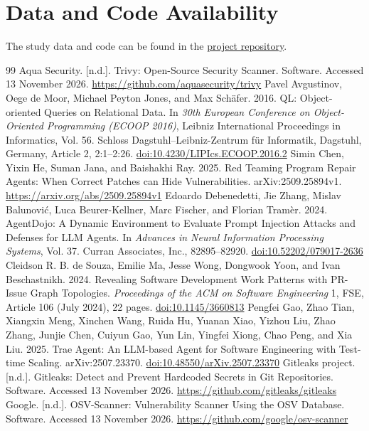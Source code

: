 \documentclass[acmsmall,screen,nonacm,review]{acmart}
\providecommand{\doi}[1]{\href{https://doi.org/#1}{doi:#1}}
\begin{document}
\section*{Data and Code Availability}

The study data and code can be found in the \href{https://github.com/Stralb/adversarial-swe-agents}{project repository}.

\clearpage
\raggedbottom
\begingroup
\begin{thebibliography}{99}
\fontsize{8}{8.5}\selectfont
\enlargethispage{\baselineskip}
\setlength{\itemsep}{0pt}
\setlength{\parsep}{0pt}
\setlength{\parskip}{0pt}
 Aqua Security. [n.d.]. Trivy: Open-Source Security Scanner. Software. Accessed 13 November 2026. \url{https://github.com/aquasecurity/trivy}
 Pavel Avgustinov, Oege de Moor, Michael Peyton Jones, and Max Sch\"afer. 2016. QL: Object-oriented Queries on Relational Data. In \emph{30th European Conference on Object-Oriented Programming (ECOOP 2016)}, Leibniz International Proceedings in Informatics, Vol. 56. Schloss Dagstuhl--Leibniz-Zentrum f\"ur Informatik, Dagstuhl, Germany, Article 2, 2:1--2:26. \doi{10.4230/LIPIcs.ECOOP.2016.2}
 Simin Chen, Yixin He, Suman Jana, and Baishakhi Ray. 2025. Red Teaming Program Repair Agents: When Correct Patches can Hide Vulnerabilities. arXiv:2509.25894v1. \url{https://arxiv.org/abs/2509.25894v1}
 Edoardo Debenedetti, Jie Zhang, Mislav Balunovi\'c, Luca Beurer-Kellner, Marc Fischer, and Florian Tram\`er. 2024. AgentDojo: A Dynamic Environment to Evaluate Prompt Injection Attacks and Defenses for LLM Agents. In \emph{Advances in Neural Information Processing Systems}, Vol. 37. Curran Associates, Inc., 82895--82920. \doi{10.52202/079017-2636}
 Cleidson R. B. de Souza, Emilie Ma, Jesse Wong, Dongwook Yoon, and Ivan Beschastnikh. 2024. Revealing Software Development Work Patterns with PR-Issue Graph Topologies. \emph{Proceedings of the ACM on Software Engineering} 1, FSE, Article 106 (July 2024), 22 pages. \doi{10.1145/3660813}
 Pengfei Gao, Zhao Tian, Xiangxin Meng, Xinchen Wang, Ruida Hu, Yuanan Xiao, Yizhou Liu, Zhao Zhang, Junjie Chen, Cuiyun Gao, Yun Lin, Yingfei Xiong, Chao Peng, and Xia Liu. 2025. Trae Agent: An LLM-based Agent for Software Engineering with Test-time Scaling. arXiv:2507.23370. \doi{10.48550/arXiv.2507.23370}
 Gitleaks project. [n.d.]. Gitleaks: Detect and Prevent Hardcoded Secrets in Git Repositories. Software. Accessed 13 November 2026. \url{https://github.com/gitleaks/gitleaks}
 Google. [n.d.]. OSV-Scanner: Vulnerability Scanner Using the OSV Database. Software. Accessed 13 November 2026. \url{https://github.com/google/osv-scanner}

\end{thebibliography}
\end{document}
